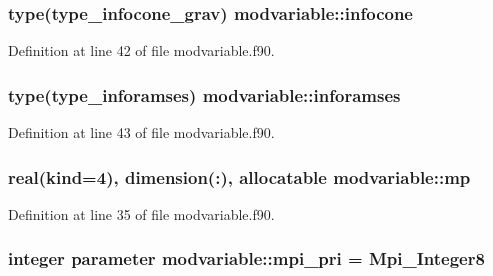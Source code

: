 \subsubsection[{\texorpdfstring{infocone}{infocone}}]{\setlength{\rightskip}{0pt plus 5cm}type({\bf type\+\_\+infocone\+\_\+grav}) modvariable\+::infocone}\hypertarget{namespacemodvariable_ab4ad6d71e8fdf948a8a42eb594ed9930}{}\label{namespacemodvariable_ab4ad6d71e8fdf948a8a42eb594ed9930}


Definition at line 42 of file modvariable.\+f90.

\subsubsection[{\texorpdfstring{inforamses}{inforamses}}]{\setlength{\rightskip}{0pt plus 5cm}type({\bf type\+\_\+inforamses}) modvariable\+::inforamses}\hypertarget{namespacemodvariable_a2742babfa57f89ec1dc1afd6852dc04e}{}\label{namespacemodvariable_a2742babfa57f89ec1dc1afd6852dc04e}


Definition at line 43 of file modvariable.\+f90.

\subsubsection[{\texorpdfstring{mp}{mp}}]{\setlength{\rightskip}{0pt plus 5cm}real(kind=4), dimension(\+:), allocatable modvariable\+::mp}\hypertarget{namespacemodvariable_abf22a007c4b2e71142484c3fe7a4977f}{}\label{namespacemodvariable_abf22a007c4b2e71142484c3fe7a4977f}


Definition at line 35 of file modvariable.\+f90.

\subsubsection[{\texorpdfstring{mpi\+\_\+pri}{mpi_pri}}]{\setlength{\rightskip}{0pt plus 5cm}integer parameter modvariable\+::mpi\+\_\+pri = Mpi\+\_\+\+Integer8}\hypertarget{namespacemodvariable_aad67fc4a7991eb6a3b666b4e42222117}{}\label{namespacemodvariable_aad67fc4a7991eb6a3b666b4e42222117}


